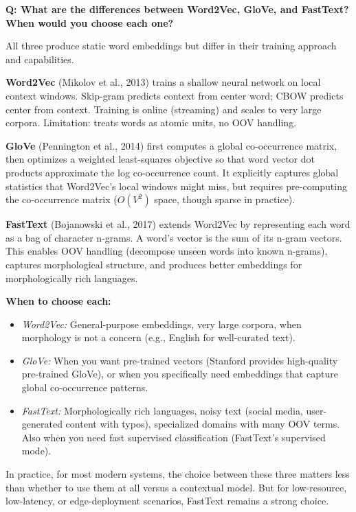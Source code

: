 \begin{interviewq}
\textbf{Q: What are the differences between Word2Vec, GloVe, and FastText?
When would you choose each one?}

 \quad {} \quad \badgefreq{\freqhigh}

\stronganswer
All three produce static word embeddings but differ in their training approach
and capabilities.

\textbf{Word2Vec} (Mikolov et al., 2013) trains a shallow neural network on
local context windows.  Skip-gram predicts context from center word; CBOW
predicts center from context.  Training is online (streaming) and scales to
very large corpora.  Limitation: treats words as atomic units, no OOV
handling.

\textbf{GloVe} (Pennington et al., 2014) first computes a global
co-occurrence matrix, then optimizes a weighted least-squares objective so
that word vector dot products approximate the log co-occurrence count.  It
explicitly captures global statistics that Word2Vec's local windows might
miss, but requires pre-computing the co-occurrence matrix ($O(V^2)$ space,
though sparse in practice).

\textbf{FastText} (Bojanowski et al., 2017) extends Word2Vec by representing
each word as a bag of character n-grams.  A word's vector is the sum of its
n-gram vectors.  This enables OOV handling (decompose unseen words into known
n-grams), captures morphological structure, and produces better embeddings
for morphologically rich languages.

\textbf{When to choose each:}
\begin{itemize}
    \item \emph{Word2Vec:} General-purpose embeddings, very large corpora,
    when morphology is not a concern (e.g., English for well-curated text).
    \item \emph{GloVe:} When you want pre-trained vectors (Stanford provides
    high-quality pre-trained GloVe), or when you specifically need embeddings
    that capture global co-occurrence patterns.
    \item \emph{FastText:} Morphologically rich languages, noisy text
    (social media, user-generated content with typos), specialized domains
    with many OOV terms.  Also when you need fast supervised classification
    (FastText's supervised mode).
\end{itemize}

In practice, for most modern systems, the choice between these three matters
less than whether to use them at all versus a contextual model.  But for
low-resource, low-latency, or edge-deployment scenarios, FastText remains a
strong choice.


\end{interviewq}
